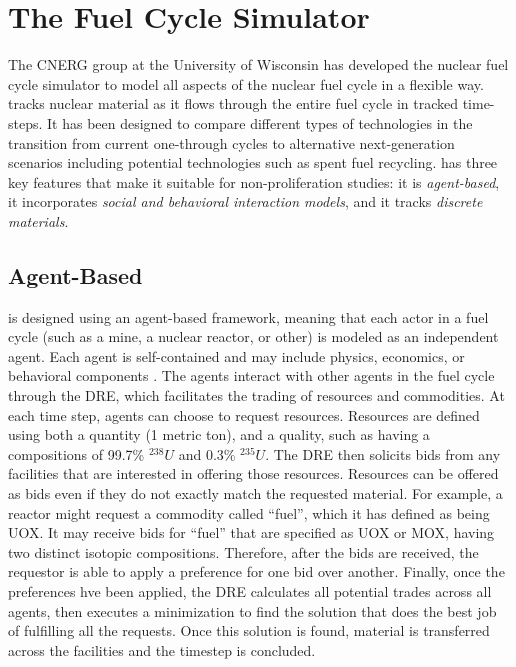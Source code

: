 \section{The \Cyclus Fuel Cycle Simulator}
\label{s_methods}

The \gls{CNERG} group at the University of Wisconsin has developed the \Cyclus nuclear fuel cycle simulator to model all aspects of the nuclear fuel cycle in a flexible way\cite{cyclus_origins}.  \Cyclus tracks nuclear material as it flows through the entire fuel cycle in tracked time-steps. It has been designed to compare different types of technologies in the transition from current one-through cycles to alternative next-generation scenarios including potential technologies such as spent fuel recycling.  \Cyclus has three key features that make it suitable for non-proliferation studies: it is \emph{agent-based}, it incorporates \emph{social and behavioral interaction models}, and it tracks \emph{discrete materials}.

\subsection{Agent-Based}
\Cyclus is designed using an agent-based framework, meaning that each actor in a fuel cycle (such as a mine, a nuclear reactor, or other) is modeled as an independent agent. Each agent is self-contained and may include physics, economics, or behavioral components .  The agents interact with other agents in the fuel cycle through the \gls{DRE}, which facilitates the trading of resources and commodities.  At each time step, agents can choose to request resources.  Resources are defined using both a quantity (1 metric ton), and a quality, such as having a compositions of 99.7\% $^{238}U$ and 0.3\% $^{235}U$.  The \gls{DRE} then solicits bids from any facilities that are interested in offering those resources. Resources can be offered as bids even if they do not exactly match the requested material. For example, a reactor might request a commodity called ``fuel'', which it has defined as being \gls{UOX}.  It may receive bids for ``fuel'' that are specified as \gls{UOX} or \gls{MOX}, having two distinct isotopic compositions. Therefore, after the bids are received, the requestor is able to apply a preference for one bid over another. Finally, once the preferences hve been applied, the \gls{DRE} calculates all potential trades across all agents, then executes a minimization to find the solution that does the best job of fulfilling all the requests.  Once this solution is found, material is transferred across the facilities and the timestep is concluded.

